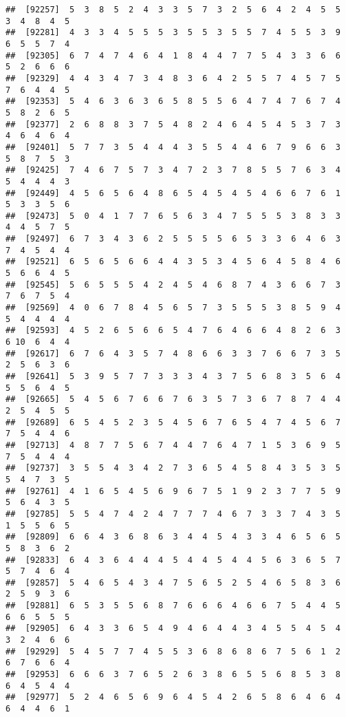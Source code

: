 \documentclass[
]{book}
\begin{document}
\begin{verbatim}
##  [92257]  5  3  8  5  2  4  3  3  5  7  3  2  5  6  4  2  4  5  5  3  4  8  4  5
##  [92281]  4  3  3  4  5  5  5  3  5  5  3  5  5  7  4  5  5  3  9  6  5  5  7  4
##  [92305]  6  7  4  7  4  6  4  1  8  4  4  7  7  5  4  3  3  6  6  5  2  6  6  6
##  [92329]  4  4  3  4  7  3  4  8  3  6  4  2  5  5  7  4  5  7  5  7  6  4  4  5
##  [92353]  5  4  6  3  6  3  6  5  8  5  5  6  4  7  4  7  6  7  4  5  8  2  6  5
##  [92377]  2  6  8  8  3  7  5  4  8  2  4  6  4  5  4  5  3  7  3  4  6  4  6  4
##  [92401]  5  7  7  3  5  4  4  4  3  5  5  4  4  6  7  9  6  6  3  5  8  7  5  3
##  [92425]  7  4  6  7  5  7  3  4  7  2  3  7  8  5  5  7  6  3  4  5  4  4  4  3
##  [92449]  4  5  6  5  6  4  8  6  5  4  5  4  5  4  6  6  7  6  1  5  3  3  5  6
##  [92473]  5  0  4  1  7  7  6  5  6  3  4  7  5  5  5  3  8  3  3  4  4  5  7  5
##  [92497]  6  7  3  4  3  6  2  5  5  5  5  6  5  3  3  6  4  6  3  7  4  5  4  4
##  [92521]  6  5  6  5  6  6  4  4  3  5  3  4  5  6  4  5  8  4  6  5  6  6  4  5
##  [92545]  5  6  5  5  5  4  2  4  5  4  6  8  7  4  3  6  6  7  3  7  6  7  5  4
##  [92569]  4  0  6  7  8  4  5  6  5  7  3  5  5  5  3  8  5  9  4  5  4  4  4  4
##  [92593]  4  5  2  6  5  6  6  5  4  7  6  4  6  6  4  8  2  6  3  6 10  6  4  4
##  [92617]  6  7  6  4  3  5  7  4  8  6  6  3  3  7  6  6  7  3  5  2  5  6  3  6
##  [92641]  5  3  9  5  7  7  3  3  3  4  3  7  5  6  8  3  5  6  4  5  5  6  4  5
##  [92665]  5  4  5  6  7  6  6  7  6  3  5  7  3  6  7  8  7  4  4  2  5  4  5  5
##  [92689]  6  5  4  5  2  3  5  4  5  6  7  6  5  4  7  4  5  6  7  7  5  4  4  6
##  [92713]  4  8  7  7  5  6  7  4  4  7  6  4  7  1  5  3  6  9  5  7  5  4  4  4
##  [92737]  3  5  5  4  3  4  2  7  3  6  5  4  5  8  4  3  5  3  5  5  4  7  3  5
##  [92761]  4  1  6  5  4  5  6  9  6  7  5  1  9  2  3  7  7  5  9  5  6  4  3  5
##  [92785]  5  5  4  7  4  2  4  7  7  7  4  6  7  3  3  7  4  3  5  1  5  5  6  5
##  [92809]  6  6  4  3  6  8  6  3  4  4  5  4  3  3  4  6  5  6  5  5  8  3  6  2
##  [92833]  6  4  3  6  4  4  4  5  4  4  5  4  4  5  6  3  6  5  7  5  7  4  6  4
##  [92857]  5  4  6  5  4  3  4  7  5  6  5  2  5  4  6  5  8  3  6  2  5  9  3  6
##  [92881]  6  5  3  5  5  6  8  7  6  6  6  4  6  6  7  5  4  4  5  6  6  5  5  5
##  [92905]  6  4  3  3  6  5  4  9  4  6  4  4  3  4  5  5  4  5  4  3  2  4  6  6
##  [92929]  5  4  5  7  7  4  5  5  3  6  8  6  8  6  7  5  6  1  2  6  7  6  6  4
##  [92953]  6  6  6  3  7  6  5  2  6  3  8  6  5  5  6  8  5  3  8  6  4  5  4  4
##  [92977]  5  2  4  6  5  6  9  6  4  5  4  2  6  5  8  6  4  6  4  6  4  4  6  1

\end{verbatim}
\end{document}
